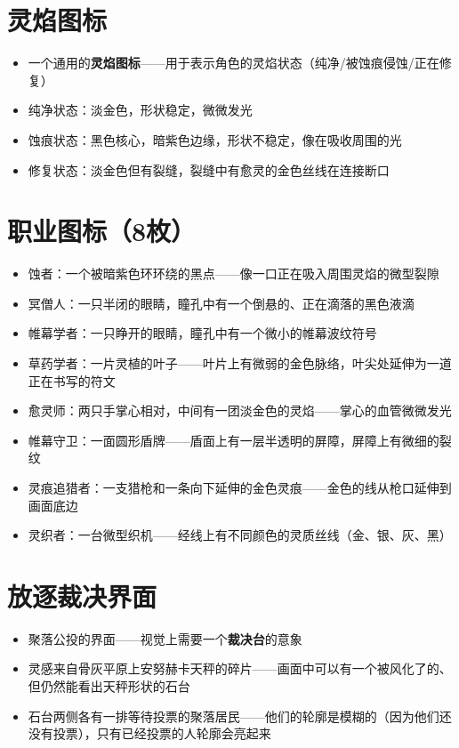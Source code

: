 \documentclass[12pt,a4paper,openany]{ctexbook}
\begin{document}
\section{灵焰图标}
\begin{itemize}
    \item 一个通用的\textbf{灵焰图标}——用于表示角色的灵焰状态（纯净/被蚀痕侵蚀/正在修复）
    \item 纯净状态：淡金色，形状稳定，微微发光
    \item 蚀痕状态：黑色核心，暗紫色边缘，形状不稳定，像在吸收周围的光
    \item 修复状态：淡金色但有裂缝，裂缝中有愈灵的金色丝线在连接断口
\end{itemize}

\section{职业图标（8枚）}
\begin{itemize}
    \item 蚀者：一个被暗紫色环环绕的黑点——像一口正在吸入周围灵焰的微型裂隙
    \item 冥僧人：一只半闭的眼睛，瞳孔中有一个倒悬的、正在滴落的黑色液滴
    \item 帷幕学者：一只睁开的眼睛，瞳孔中有一个微小的帷幕波纹符号
    \item 草药学者：一片灵植的叶子——叶片上有微弱的金色脉络，叶尖处延伸为一道正在书写的符文
    \item 愈灵师：两只手掌心相对，中间有一团淡金色的灵焰——掌心的血管微微发光
    \item 帷幕守卫：一面圆形盾牌——盾面上有一层半透明的屏障，屏障上有微细的裂纹
    \item 灵痕追猎者：一支猎枪和一条向下延伸的金色灵痕——金色的线从枪口延伸到画面底边
    \item 灵织者：一台微型织机——经线上有不同颜色的灵质丝线（金、银、灰、黑）
\end{itemize}

\section{放逐裁决界面}
\begin{itemize}
    \item 聚落公投的界面——视觉上需要一个\textbf{裁决台}的意象
    \item 灵感来自骨灰平原上安努赫卡天秤的碎片——画面中可以有一个被风化了的、但仍然能看出天秤形状的石台
    \item 石台两侧各有一排等待投票的聚落居民——他们的轮廓是模糊的（因为他们还没有投票），只有已经投票的人轮廓会亮起来
\end{itemize}
\end{document}
